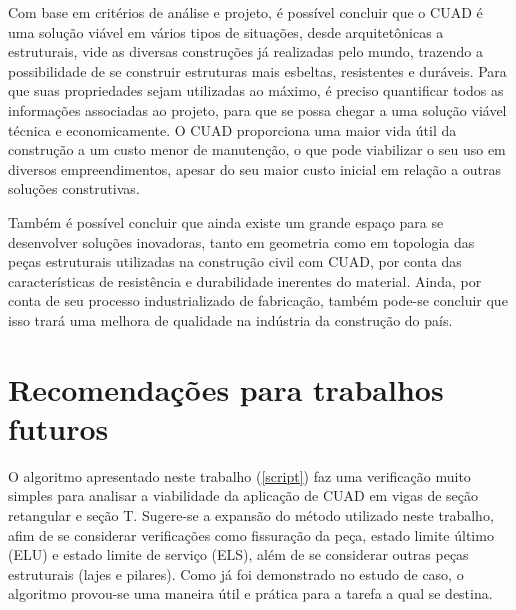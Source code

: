\documentclass[
	12pt,				%
	openright,			%
	oneside,			%
	a4paper,			%
	chapter=TITLE,		%
	english,			%
	french,				%
	spanish,			%
	brazil				%
	]{abntex2}
\begin{document}
Com base em critérios de análise e projeto, é possível concluir que o CUAD é uma solução viável em vários tipos de situações, desde arquitetônicas a estruturais, vide as diversas construções já realizadas pelo mundo, trazendo a possibilidade de se construir estruturas mais esbeltas, resistentes e duráveis. Para que suas propriedades sejam utilizadas ao máximo, é preciso quantificar todos as informações associadas ao projeto, para que se possa chegar a uma solução viável técnica e economicamente. O CUAD proporciona uma maior vida útil da construção a um custo menor de manutenção, o que pode viabilizar o seu uso em diversos empreendimentos, apesar do seu maior custo inicial em relação a outras soluções construtivas.

Também é possível concluir que ainda existe um grande espaço para se desenvolver soluções inovadoras, tanto em geometria como em topologia das peças estruturais utilizadas na construção civil com CUAD, por conta das características de resistência e durabilidade inerentes do material. Ainda, por conta de seu processo industrializado de fabricação, também pode-se concluir que isso trará uma melhora de qualidade na indústria da construção do país.


\chapter{Recomendações para trabalhos futuros}

O algoritmo apresentado neste trabalho (\autoref{script}) faz uma verificação muito simples para analisar a viabilidade da aplicação de CUAD em vigas de seção retangular e seção T. Sugere-se a expansão do método utilizado neste trabalho, afim de se considerar verificações como fissuração da peça, estado limite último (ELU) e estado limite de serviço (ELS), além de se considerar outras peças estruturais (lajes e pilares). Como já foi demonstrado no estudo de caso, o algoritmo provou-se uma maneira útil e prática para a tarefa a qual se destina.


\postextual



%
%
\end{document}
